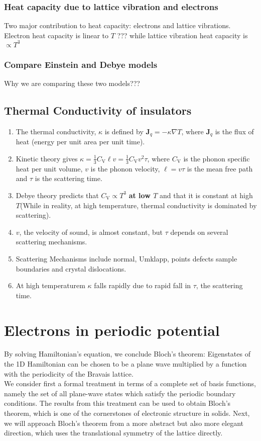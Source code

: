 \documentclass[12pt,a4paper]{article}
\begin{document}
    \subsubsection{Heat capacity due to lattice vibration and electrons}
    Two major contribution to heat capacity: electrons and lattice vibrations. Electron heat capacity is linear to $T$ ??? while lattice vibration heat capacity is $\propto T^3$
    \subsubsection{Compare Einstein and Debye models}
    Why we are comparing these two models???
\subsection{Thermal Conductivity of insulators}
    \begin{enumerate}
        \item The thermal conductivity, $\kappa$ is defined by $\boldsymbol{J}_q=-\kappa \nabla T$, where $\boldsymbol{J}_q$ is the flux of heat (energy per unit area per unit time).
        \item Kinetic theory gives $\kappa=\frac{1}{3} C_{\mathrm{V}} \ell v=\frac{1}{3} C_{\mathrm{V}} v^2 \tau$, where $C_{\mathrm{V}}$ is the phonon specific heat per unit volume, $v$ is the phonon velocity, $\ell=v \tau$ is the mean free path and $\tau$ is the scattering time. 
        \item Debye theory predicts that $C_{\mathrm{V}} \propto T^3$ \textbf{at low $T$} and that it is constant at high $T$(While in reality, at high temperature, thermal conductivity is dominated by scattering). 
        \item $v$, the velocity of sound, is almost constant, but $\tau$ depends on several scattering mechanisms. 
        \item Scattering Mechanisms include normal, Umklapp, points defects sample boundaries and crystal dislocations.
        \item At high temperaturem $\kappa$ falls rapidly due to rapid fall in $\tau$, the scattering time. 
    \end{enumerate}
\section{Electrons in periodic potential}
    By solving Hamiltonian's equation, we conclude Bloch's theorem: Eigenstates of the 1D Hamiltonian can be chosen to be a plane wave multiplied by a function with the periodicity of the Bravais lattice.\\
    We consider first a formal treatment in terms of a complete set of basis functions, namely the set of all plane-wave states which satisfy the periodic boundary conditions. The results from this treatment can be used to obtain Bloch's theorem, which is one of the cornerstones of electronic structure in solids. Next, we will approach Bloch's theorem from a more abstract but also more elegant direction, which uses the translational symmetry of the lattice directly.
\end{document}
